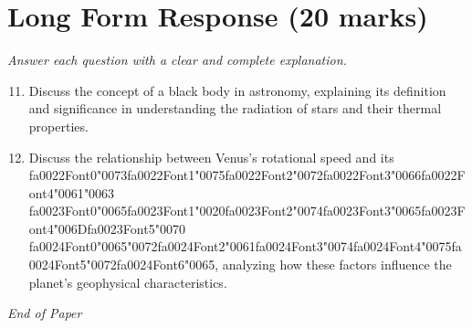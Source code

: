 \documentclass[12pt]{article}
\begin{document}
\section*{Long Form Response (20 marks)}
\textit{Answer each question with a clear and complete explanation.}
\begin{enumerate}[label=\arabic*.]
\setcounter{enumi}{10}
\item Discuss the concept of a black body in astronomy, explaining its definition and
significance in understanding the radiation of stars and their thermal properties.
\item Discuss the relationship between Venus's rotational speed and its {\csname fa0022Font0\endcsname\char"0073}{\csname fa0022Font1\endcsname\char"0075}{\csname fa0022Font2\endcsname\char"0072}{\csname fa0022Font3\endcsname\char"0066}{\csname fa0022Font4\endcsname\char"0061}{\char"0063} {\csname fa0023Font0\endcsname\char"0065}{\csname fa0023Font1\endcsname\char"0020}{\csname fa0023Font2\endcsname\char"0074}{\csname fa0023Font3\endcsname\char"0065}{\csname fa0023Font4\endcsname\char"006D}{\csname fa0023Font5\endcsname\char"0070} {\csname fa0024Font0\endcsname\char"0065}{\char"0072}{\csname fa0024Font2\endcsname\char"0061}{\csname fa0024Font3\endcsname\char"0074}{\csname fa0024Font4\endcsname\char"0075}{\csname fa0024Font5\endcsname\char"0072}{\csname fa0024Font6\endcsname\char"0065},
analyzing how these factors influence the planet's geophysical characteristics.
\end{enumerate}

\vfill
\noindent\textit{End of Paper}
\end{document}

